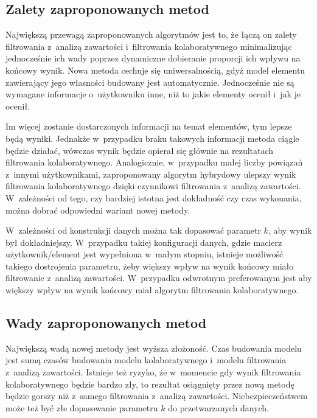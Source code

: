 \documentclass[twoside]{iisthesis}
\begin{document}
		 \subsection{Zalety zaproponowanych metod}
		 
		 Największą przewagą zaproponowanych algorytmów jest to, że łączą on zalety filtrowania z~analizą zawartości i~filtrowania kolaboratywnego minimalizując jednocześnie ich wady poprzez dynamiczne dobieranie proporcji ich wpływu na końcowy wynik. Nowa metoda cechuje się uniwersalnością, gdyż model elementu zawierający jego własności budowany jest automatycznie. Jednocześnie nie są wymagane informacje o~użytkowniku inne, niż to jakie elementy ocenił i~jak je ocenił. 
		 
		 Im więcej zostanie dostarczonych informacji na temat elementów, tym lepsze będą wyniki. Jednakże w~przypadku braku takowych informacji metoda ciągle będzie działać,  wówczas wynik będzie opierał się głównie na rezultatach filtrowania kolaboratywnego. Analogicznie, w~przypadku małej liczby powiązań z~innymi użytkownikami, zaproponowany algorytm hybrydowy ulepszy wynik filtrowania kolaboratywnego dzięki czynnikowi filtrowania z~analizą zawartości. W~zależności od tego, czy bardziej istotna jest dokładność czy czas wykonania, można dobrać odpowiedni wariant nowej metody. 
		 
		 W~zależności od konstrukcji danych można tak dopasować parametr $k$, aby wynik był dokładniejszy. W~przypadku takiej konfiguracji danych, gdzie macierz użytkownik\-/element jest wypełniona w~małym stopniu, istnieje możliwość takiego dostrojenia parametru, żeby większy wpływ na wynik końcowy miało filtrowanie z~analizą zawartości. W~przypadku odwrotnym preferowanym jest aby większy wpływ na wynik końcowy miał algorytm filtrowania kolaboratywnego.
		 
		 \subsection{Wady zaproponowanych metod}
		 
		 Największą wadą nowej metody jest wyższa złożoność. Czas budowania modelu jest sumą czasów budowania modelu kolaboratywnego i~modelu filtrowania z~analizą zawartości. Istnieje też ryzyko, że w~momencie gdy wynik filtrowania kolaboratywnego będzie bardzo zły, to rezultat osiągnięty przez nową metodę będzie gorszy niż z~samego filtrowania z~analizą zawartości. Niebezpieczeństwem może też być złe dopasowanie parametru $k$ do przetwarzanych danych.
 
\end{document}
